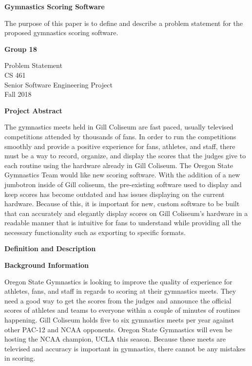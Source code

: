\documentclass[letterpaper,10pt,draftclsnofoot,onecolumn,]{IEEEtran}
\begin{document}
\begin{titlepage}
    \begin{center}
        \vspace*{1cm}
        
        \textbf{Gymnastics Scoring Software}
        
        \vspace{0.5cm}
        The purpose of this paper is to define and describe a problem statement for the proposed gymnastics scoring software.
        
        \vspace{1.5cm}
        
        \textbf{Group 18}
        
        Problem Statement\\
        CS 461\\
        Senior Software Engineering Project\\
        Fall 2018
        
    \end{center}
\end{titlepage}

\begin{center}
\textbf{Project Abstract}\\
\end{center}
The gymnastics meets held in Gill Coliseum are fast paced, usually televised competitions attended by thousands of fans. In order to run the competitions smoothly and provide a positive experience for fans, athletes, and staff, there must be a way to record, organize, and display the scores that the judges give to each routine using the hardware already in Gill Coliseum. The Oregon State Gymnastics Team would like new scoring software. With the addition of a new jumbotron inside of Gill coliseum, the pre-existing software used to display and keep scores has become outdated and has issues displaying on the current hardware. Because of this, it is important for new, custom software to be built that can accurately and elegantly display scores on Gill Coliseum's hardware in a readable manner that is intuitive for fans to understand while providing all the necessary functionality such as exporting to specific formats.\\

\begin{center}
\textbf{Definition and Description}\\
\end{center}

\textbf{Background Information}
\par Oregon State Gymnastics is looking to improve the quality of experience for athletes, fans, and staff in regards to scoring at their gymnastics meets. They need a good way to get the scores from the judges and announce the official scores of athletes and teams to everyone within a couple of minutes of routines happening. Gill Coliseum holds five to six gymnastics meets per year against other PAC-12 and NCAA opponents. Oregon State Gymnastics will even be hosting the NCAA champion, UCLA this season. Because these meets are televised and accuracy is important in gymnastics, there cannot be any mistakes in scoring.\\
\end{document}
